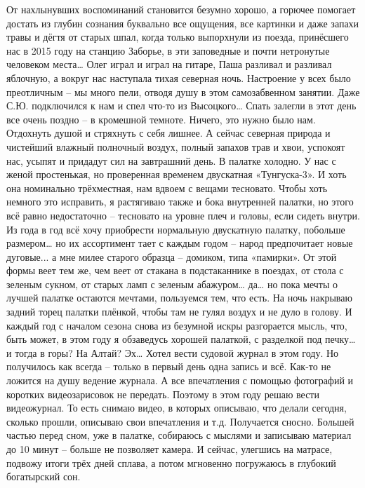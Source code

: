 От нахлынувших воспоминаний становится безумно хорошо, а горючее помогает достать из глубин сознания буквально все ощущения, все картинки и даже запахи травы и дёгтя от старых шпал, когда только выпорхнули из поезда, принёсшего нас в 2015 году на станцию Заборье, в эти заповедные и почти нетронутые человеком места… Олег играл и играл на гитаре, Паша разливал и разливал яблочную, а вокруг нас наступала тихая северная ночь. Настроение у всех было преотличным – мы много пели, отводя душу в этом самозабвенном занятии. Даже С.Ю. подключился к нам и спел что-то из Высоцкого…
Спать залегли в этот день все очень поздно – в кромешной темноте. Ничего, это нужно было нам. Отдохнуть душой и стряхнуть с себя лишнее. А сейчас северная природа и чистейший влажный полночный воздух, полный запахов трав и хвои, успокоят нас, усыпят и придадут сил на завтрашний день. 
В палатке холодно. У нас с женой простенькая, но проверенная временем двускатная «Тунгуска-3». И хоть она номинально трёхместная, нам вдвоем с вещами тесновато. Чтобы хоть немного это исправить, я растягиваю также и бока внутренней палатки, но этого всё равно недостаточно – тесновато на уровне плеч и головы, если сидеть внутри. Из года в год всё хочу приобрести нормальную двускатную палатку, побольше размером… но их ассортимент тает с каждым годом – народ предпочитает новые дуговые... а мне милее старого образца – домиком, типа «памирки». От этой формы веет тем же, чем веет от стакана в подстаканнике в поездах, от стола с зеленым сукном, от старых ламп с зеленым абажуром… да… но пока мечты о лучшей палатке остаются мечтами, пользуемся тем, что есть. На ночь накрываю задний торец палатки плёнкой, чтобы там не гулял воздух и не дуло в голову. И каждый год с началом сезона снова из безумной искры разгорается мысль, что, быть может, в этом году я обзаведусь хорошей палаткой, с разделкой под печку… и тогда в горы? На Алтай? Эх…
Хотел вести судовой журнал в этом году. Но получилось как всегда – только в первый день одна запись и всё. Как-то не ложится на душу ведение журнала. А все впечатления с помощью фотографий и коротких видеозарисовок не передать. Поэтому в этом году решаю вести видеожурнал. То есть снимаю видео, в которых описываю, что делали сегодня, сколько прошли, описываю свои впечатления и т.д. Получается сносно. Большей частью перед сном, уже в палатке, собираюсь с мыслями и записываю материал до 10 минут – больше не позволяет камера. И сейчас, улегшись на матрасе, подвожу итоги трёх дней сплава, а потом мгновенно погружаюсь в глубокий богатырский сон.

\begin{center}
\end{center}
